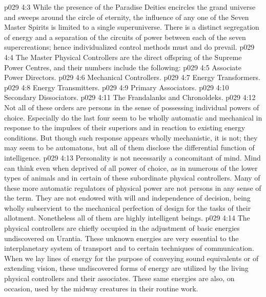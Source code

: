 \vs p029 4:3 While the presence of the Paradise Deities encircles the grand universe and sweeps around the circle of eternity, the influence of any one of the Seven Master Spirits is limited to a single superuniverse. There is a distinct segregation of energy and a separation of the circuits of power between each of the seven supercreations; hence individualized control methods must and do prevail.
\vs p029 4:4 \pc The Master Physical Controllers are the direct offspring of the Supreme Power Centres, and their numbers include the following:
\vs p029 4:5 \bibnobreakspace Associate Power Directors.
\vs p029 4:6 \bibnobreakspace Mechanical Controllers.
\vs p029 4:7 \bibnobreakspace Energy Transformers.
\vs p029 4:8 \bibnobreakspace Energy Transmitters.
\vs p029 4:9 \bibnobreakspace Primary Associators.
\vs p029 4:10 \bibnobreakspace Secondary Dissociators.
\vs p029 4:11 \bibnobreakspace The Frandalanks and Chronoldeks.
\vs p029 4:12 \pc Not all of these orders are persons in the sense of possessing individual powers of choice. Especially do the last four seem to be wholly automatic and mechanical in response to the impulses of their superiors and in reaction to existing energy conditions. But though such response appears wholly mechanistic, it is not; they may seem to be automatons, but all of them disclose the differential function of intelligence.
\vs p029 4:13 Personality is not necessarily a concomitant of mind. Mind can think even when deprived of all power of choice, as in numerous of the lower types of animals and in certain of these subordinate physical controllers. Many of these more automatic regulators of physical power are not persons in any sense of the term. They are not endowed with will and independence of decision, being wholly subservient to the mechanical perfection of design for the tasks of their allotment. Nonetheless all of them are highly intelligent beings.
\vs p029 4:14 The physical controllers are chiefly occupied in the adjustment of basic energies undiscovered on Urantia. These unknown energies are very essential to the interplanetary system of transport and to certain techniques of communication. When we lay lines of energy for the purpose of conveying sound equivalents or of extending vision, these undiscovered forms of energy are utilized by the living physical controllers and their associates. These same energies are also, on occasion, used by the midway creatures in their routine work.
